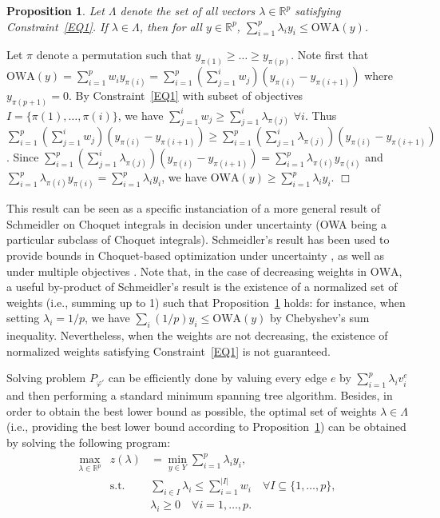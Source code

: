 \documentclass[final,3p,times]{elsarticle}
\newcommand{\owa}{\mbox{OWA}}
\newcommand{\RP}{\mathbb{R}^p}
\newtheorem{prop}{\bf Proposition}
\newenvironment{pf}[1][]{{\noindent \bf Proof. #1 }}{\hfill $\Box$\\ }
\begin{document}
\begin{prop}\label{PROP2}
Let $\Lambda$ denote the set of all vectors $\lambda \in \RP$ satisfying Constraint~\ref{EQ1}. If $\lambda \in \Lambda$, then for all $y \in \RP$, $\sum_{i=1}^p \lambda_i y_i \leq \owa(y)$.
\end{prop}

\begin{pf}
Let $\pi$ denote a permutation such that $y_{\pi(1)} \ge \ldots \ge y_{\pi(p)}$. Note first that $\owa(y) = \sum_{i=1}^p w_i y_{\pi(i)} = \sum_{i=1}^p (\sum_{j=1}^i w_j) (y_{\pi(i)} - y_{\pi(i+1)})$ where $y_{\pi(p+1)} = 0$. By Constraint~\ref{EQ1} with subset of objectives $I = \{\pi(1),\ldots,\pi(i)\}$, we have $\sum_{j=1}^i w_j \geq \sum_{j=1}^i \lambda_{\pi(j)}$ $\forall i$. Thus $\sum_{i=1}^p (\sum_{j=1}^i w_j) (y_{\pi(i)} - y_{\pi(i+1)}) \geq \sum_{i=1}^p (\sum_{j=1}^i \lambda_{\pi(j)}) (y_{\pi(i)} - y_{\pi(i+1)})$. Since $\sum_{i=1}^p (\sum_{j=1}^i \lambda_{\pi(j)}) (y_{\pi(i)} - y_{\pi(i+1)}) = \sum_{i=1}^p \lambda_{\pi(i)} y_{\pi(i)}$ and $\sum_{i=1}^p \lambda_{\pi(i)} y_{\pi(i)} = \sum_{i=1}^p \lambda_i y_i$, we have $\owa(y) \geq \sum_{i=1}^p \lambda_i y_i$.
\end{pf}

This result can be seen as a specific instanciation of a more general result of Schmeidler \cite{Schme86,Schme89} on Choquet integrals  in decision under uncertainty (OWA being a particular subclass of Choquet integrals). Schmeidler's result has been used to provide bounds in Choquet-based optimization under uncertainty \cite{GalaP07}, as well as under multiple objectives \cite{GalPS09}. Note that, in the case of decreasing weights in $\owa$, a useful by-product of Schmeidler's result is the existence of a normalized set of weights (i.e., summing up to 1) such that Proposition~\ref{PROP2} holds: for instance, when setting $\lambda_i = 1/p$, we have $\sum_i (1/p)y_i \leq \owa(y)$ by Chebyshev's sum inequality. Nevertheless, when the weights are not decreasing, the existence of normalized weights satisfying Constraint~\ref{EQ1} is not guaranteed.

Solving problem $P_{\varphi'}$ can be efficiently done by valuing every edge $e$ by $\sum_{i=1}^p \lambda_i v^e_i$ and then performing a standard minimum spanning tree algorithm. Besides, in order to obtain the best lower bound as possible, the optimal set of weights $\lambda \in \Lambda$ (i.e., providing the best lower bound according to Proposition~\ref{PROP2}) can be obtained by solving the following program:
\vspace*{-0.2cm}
\begin{eqnarray*}
 \max_{\lambda \in \mathbb{R}^p} & z(\lambda) &  = \min_{y \in Y} \sum_{i=1}^p \lambda_i y_i, \\
 & \mbox{s.t. } & \sum_{i \in I} \lambda_i \leq \sum_{i=1}^{\vert I \vert} w_i \quad \forall I \subseteq \{1,\ldots,p\},\\
& & \lambda_i \geq 0 \quad \forall i = 1, \ldots, p. \label{const2}
\end{eqnarray*}
\end{document}
